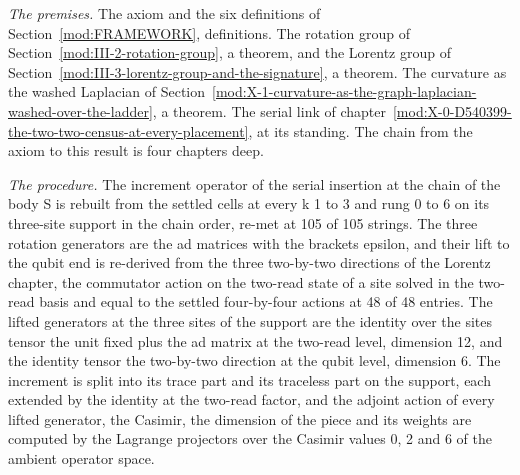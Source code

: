 \begin{chproof}
\textit{The premises.} The axiom and the six definitions of Section~\ref{mod:FRAMEWORK}, definitions. The rotation group of Section~\ref{mod:III-2-rotation-group}, a theorem, and the Lorentz group of Section~\ref{mod:III-3-lorentz-group-and-the-signature}, a theorem. The curvature as the washed Laplacian of Section~\ref{mod:X-1-curvature-as-the-graph-laplacian-washed-over-the-ladder}, a theorem. The serial link of chapter~\ref{mod:X-0-D540399-the-two-two-census-at-every-placement}, at its standing. The chain from the axiom to this result is four chapters deep.

\textit{The procedure.} The increment operator of the serial insertion at the chain of the body S is rebuilt from the settled cells at every k 1 to 3 and rung 0 to 6 on its three-site support in the chain order, re-met at 105 of 105 strings. The three rotation generators are the ad matrices with the brackets epsilon, and their lift to the qubit end is re-derived from the three two-by-two directions of the Lorentz chapter, the commutator action on the two-read state of a site solved in the two-read basis and equal to the settled four-by-four actions at 48 of 48 entries. The lifted generators at the three sites of the support are the identity over the sites tensor the unit fixed plus the ad matrix at the two-read level, dimension 12, and the identity tensor the two-by-two direction at the qubit level, dimension 6. The increment is split into its trace part and its traceless part on the support, each extended by the identity at the two-read factor, and the adjoint action of every lifted generator, the Casimir, the dimension of the piece and its weights are computed by the Lagrange projectors over the Casimir values 0, 2 and 6 of the ambient operator space.


\end{chproof}
